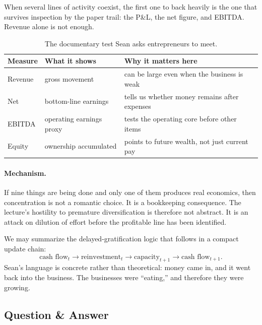 \begin{definition}
When several lines of activity coexist, the first one to back heavily is the one that survives inspection by the paper trail: the P\&L, the net figure, and EBITDA. Revenue alone is not enough.
\end{definition}

\begin{table}[h]
\centering
\begin{tabular}{|l|l|l|}
\hline
Measure & What it shows & Why it matters here \\
\hline
Revenue & gross movement & can be large even when the business is weak \\
\hline
Net & bottom-line earnings & tells us whether money remains after expenses \\
\hline
EBITDA & operating earnings proxy & tests the operating core before other items \\
\hline
Equity & ownership accumulated & points to future wealth, not just current pay \\
\hline
\end{tabular}
\caption{The documentary test Sean asks entrepreneurs to meet.}
\end{table}

\paragraph{Mechanism.}
If nine things are being done and only one of them produces real economics, then concentration is not a romantic choice. It is a bookkeeping consequence. The lecture's hostility to premature diversification is therefore not abstract. It is an attack on dilution of effort before the profitable line has been identified.

We may summarize the delayed-gratification logic that follows in a compact update chain:
\begin{equation}
\text{cash flow}_t \longrightarrow \text{reinvestment}_t \longrightarrow \text{capacity}_{t+1} \longrightarrow \text{cash flow}_{t+1}.
\end{equation}
Sean's language is concrete rather than theoretical: money came in, and it went back into the business. The businesses were ``eating,'' and therefore they were growing.

\subsection{Question \& Answer}


